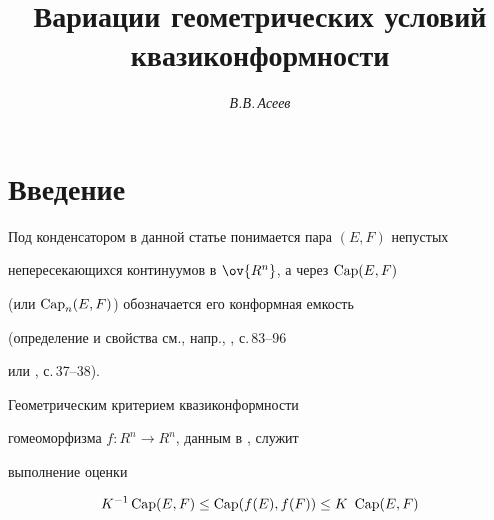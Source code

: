 








\author{\it В.В.\,Асеев }




\title{Вариации геометрических условий квазиконформности}





\date{}




\pagestyle{plain} %







\maketitle


\label{begin}











\section*{Введение}





Под конденсатором в данной статье понимается пара $(E,F)$ непустых 


непересекающихся континуумов в $\ov{R^n}$, а через $\operatorname{Cap}(E,F)$ 


(или $\operatorname{Cap}_n (E,F)$) обозначается его конформная емкость 


(определение и свойства см., напр., \cite{Vu}, с.\,83--96


или \cite{Syc}, с.\,37--38).


Геометрическим критерием квазиконформности 


гомеоморфизма $f: R^n \to R^n$, данным в \cite{Ger}, служит 


выполнение оценки


\begin{equation}


\label{Gr}


K^{-1}\Capp(E,F) \leq \Capp(f(E), f(F)) \leq K\ \Capp(E,F) 


\end{equation} 


